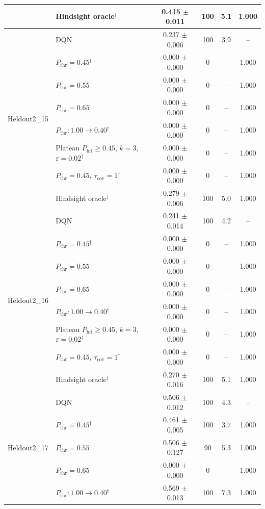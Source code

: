 \begin{table}[htbp]
\begin{tabular}{llcccc}
 & Hindsight oracle$^{\ddagger}$ & 0.415 $\pm$ 0.011 & 100 & 5.1 & 1.000 \\
\midrule
\multirow{8}{*}{Heldout2\_15} & DQN & 0.237 $\pm$ 0.006 & 100 & 3.9 & -- \\
 & $P_{\mathrm{thr}}=0.45$$^{\dagger}$ & 0.000 $\pm$ 0.000 & 0 & -- & 1.000 \\
 & $P_{\mathrm{thr}}=0.55$ & 0.000 $\pm$ 0.000 & 0 & -- & 1.000 \\
 & $P_{\mathrm{thr}}=0.65$ & 0.000 $\pm$ 0.000 & 0 & -- & 1.000 \\
 & $P_{\mathrm{thr}}: 1.00 \to 0.40$$^{\dagger}$ & 0.000 $\pm$ 0.000 & 0 & -- & 1.000 \\
 & Plateau $P_{\mathrm{hit}}\geq0.45$, $k=3$, $\varepsilon=0.02$$^{\dagger}$ & 0.000 $\pm$ 0.000 & 0 & -- & 1.000 \\
 & $P_{\mathrm{thr}}=0.45$, $\tau_{\mathrm{cov}}=1$$^{\dagger}$ & 0.000 $\pm$ 0.000 & 0 & -- & 1.000 \\
 & Hindsight oracle$^{\ddagger}$ & 0.279 $\pm$ 0.006 & 100 & 5.0 & 1.000 \\
\midrule
\multirow{8}{*}{Heldout2\_16} & DQN & 0.241 $\pm$ 0.014 & 100 & 4.2 & -- \\
 & $P_{\mathrm{thr}}=0.45$$^{\dagger}$ & 0.000 $\pm$ 0.000 & 0 & -- & 1.000 \\
 & $P_{\mathrm{thr}}=0.55$ & 0.000 $\pm$ 0.000 & 0 & -- & 1.000 \\
 & $P_{\mathrm{thr}}=0.65$ & 0.000 $\pm$ 0.000 & 0 & -- & 1.000 \\
 & $P_{\mathrm{thr}}: 1.00 \to 0.40$$^{\dagger}$ & 0.000 $\pm$ 0.000 & 0 & -- & 1.000 \\
 & Plateau $P_{\mathrm{hit}}\geq0.45$, $k=3$, $\varepsilon=0.02$$^{\dagger}$ & 0.000 $\pm$ 0.000 & 0 & -- & 1.000 \\
 & $P_{\mathrm{thr}}=0.45$, $\tau_{\mathrm{cov}}=1$$^{\dagger}$ & 0.000 $\pm$ 0.000 & 0 & -- & 1.000 \\
 & Hindsight oracle$^{\ddagger}$ & 0.270 $\pm$ 0.016 & 100 & 5.1 & 1.000 \\
\midrule
\multirow{8}{*}{Heldout2\_17} & DQN & 0.506 $\pm$ 0.012 & 100 & 4.3 & -- \\
 & $P_{\mathrm{thr}}=0.45$$^{\dagger}$ & 0.461 $\pm$ 0.005 & 100 & 3.7 & 1.000 \\
 & $P_{\mathrm{thr}}=0.55$ & 0.506 $\pm$ 0.127 & 90 & 5.3 & 1.000 \\
 & $P_{\mathrm{thr}}=0.65$ & 0.000 $\pm$ 0.000 & 0 & -- & 1.000 \\
 & $P_{\mathrm{thr}}: 1.00 \to 0.40$$^{\dagger}$ & 0.569 $\pm$ 0.013 & 100 & 7.3 & 1.000 \\

\end{tabular}
\end{table}
